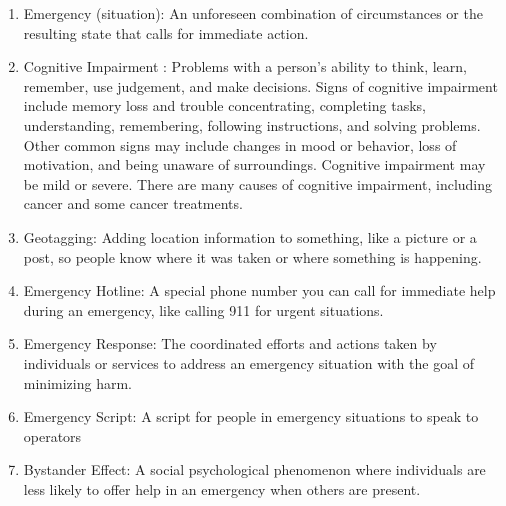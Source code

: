 \begin{enumerate}
    \item Emergency (situation): An unforeseen combination of circumstances or the resulting state that calls for immediate action.
    \item Cognitive Impairment : Problems with a person’s ability to think, learn, remember, use judgement, and make decisions. Signs of cognitive impairment include memory loss and trouble concentrating, completing tasks, understanding, remembering, following instructions, and solving problems. Other common signs may include changes in mood or behavior, loss of motivation, and being unaware of surroundings. Cognitive impairment may be mild or severe. There are many causes of cognitive impairment, including cancer and some cancer treatments.
    \item Geotagging: Adding location information to something, like a picture or a post, so people know where it was taken or where something is happening.
    \item Emergency Hotline: A special phone number you can call for immediate help during an emergency, like calling 911 for urgent situations.
    \item Emergency Response: The coordinated efforts and actions taken by individuals or services to address an emergency situation with the goal of minimizing harm.
    \item Emergency Script: A script for people in emergency situations to speak to operators
    \item Bystander Effect: A social psychological phenomenon where individuals are less likely to offer help in an emergency when others are present.
\end{enumerate}